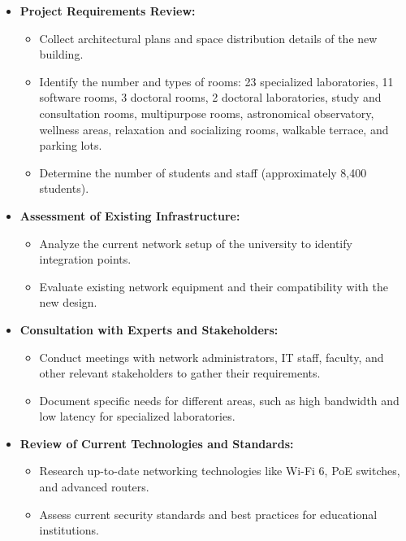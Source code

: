 \documentclass[12pt]{article}
\begin{document}
\begin{itemize}
    \item \textbf{Project Requirements Review:}
        \begin{itemize}
            \item Collect architectural plans and space distribution details of the new building.
            \item Identify the number and types of rooms: 23 specialized laboratories, 11 software rooms, 3 doctoral rooms, 2 doctoral laboratories, study and consultation rooms, multipurpose rooms, astronomical observatory, wellness areas, relaxation and socializing rooms, walkable terrace, and parking lots.
            \item Determine the number of students and staff (approximately 8,400 students).
        \end{itemize}
    \item \textbf{Assessment of Existing Infrastructure:}
        \begin{itemize}
            \item Analyze the current network setup of the university to identify integration points.
            \item Evaluate existing network equipment and their compatibility with the new design.
        \end{itemize}
    \item \textbf{Consultation with Experts and Stakeholders:}
        \begin{itemize}
            \item Conduct meetings with network administrators, IT staff, faculty, and other relevant stakeholders to gather their requirements.
            \item Document specific needs for different areas, such as high bandwidth and low latency for specialized laboratories.
        \end{itemize}
    \item \textbf{Review of Current Technologies and Standards:}
        \begin{itemize}
            \item Research up-to-date networking technologies like Wi-Fi 6, PoE switches, and advanced routers.
            \item Assess current security standards and best practices for educational institutions.
        \end{itemize}
\end{itemize}
\end{document}
